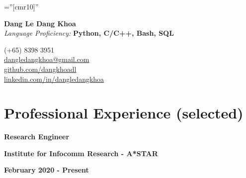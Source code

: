 \documentclass[10pt]{article}
\begin{document}
    \pagestyle{empty}       %
    \font\fb=''[cmr10]''    %

    \begin{multicols}{2}
        \begin{flushleft}
            \textbf{{\Huge Dang Le Dang Khoa }} \\
            \vspace{2mm}
            \emph{Language Proficiency:} \textbf{Python, C/C++, Bash, SQL}
        \end{flushleft}

        \columnbreak

        \begin{flushright}
            \textsc (+65) 8398 3951 \\
            \href{mailto:dangledangkhoa@gmail.com}{dangledangkhoa@gmail.com} \\
            \href{https://github.com/dangkhoadl}{github.com/dangkhoadl} \\
            \href{https://sg.linkedin.com/in/dangledangkhoa}{linkedin.com/in/dangledangkhoa}
        \end{flushright}
    \end{multicols}


    \vspace{-5mm}
    \section{Professional Experience (selected)}

        \begin{multicols}{3}
            \begin{flushleft}
                \textbf{Research Engineer}
            \end{flushleft}

            \columnbreak

            \begin{center}
                \textbf{Institute for Infocomm Research - A*STAR}
            \end{center}

            \columnbreak

            \begin{flushright}
                \textbf{February 2020 - Present}
            \end{flushright}
        \end{multicols}
\end{document}
